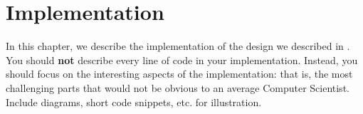 \chapter{Implementation}
\label{ch:implementation}

In this chapter, we describe the implementation of the design we described in . You should \textbf{not} describe every line of code in your implementation. Instead, you should focus on the interesting aspects of the implementation: that is, the most challenging parts that would not be obvious to an average Computer Scientist. Include diagrams, short code snippets, etc. for illustration. 
